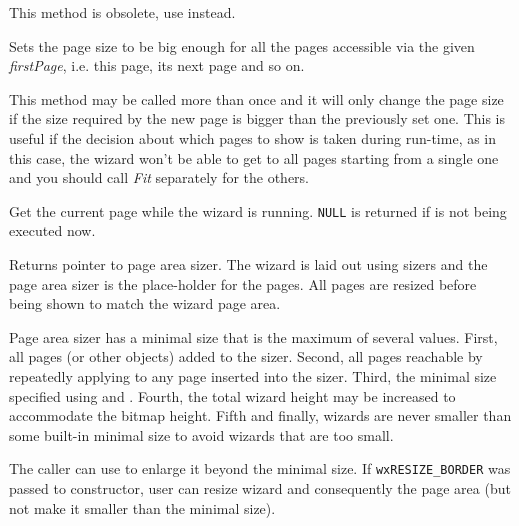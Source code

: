 

\label{wxwizardfittopage}


This method is obsolete, use
 instead.

Sets the page size to be big enough for all the pages accessible via the
given {\it firstPage}, i.e. this page, its next page and so on.

This method may be called more than once and it will only change the page size
if the size required by the new page is bigger than the previously set one.
This is useful if the decision about which pages to show is taken during
run-time, as in this case, the wizard won't be able to get to all pages starting
from a single one and you should call {\it Fit} separately for the others.


\label{wxwizardgetcurrentpage}


Get the current page while the wizard is running. {\tt NULL} is returned if 
 is not being executed now.


\label{wxwizardgetpageareasizer}


Returns pointer to page area sizer. The wizard is laid out using sizers and
the page area sizer is the place-holder for the pages. All pages are resized before
being shown to match the wizard page area.

Page area sizer has a minimal size that is the maximum of several values. First,
all pages (or other objects) added to the sizer. Second, all pages reachable
by repeatedly applying 
 to
any page inserted into the sizer. Third,
the minimal size specified using  and 
. Fourth, the total wizard height may
be increased to accommodate the bitmap height. Fifth and finally, wizards are
never smaller than some built-in minimal size to avoid wizards that are too small.

The caller can use  to enlarge it
beyond the minimal size. If {\tt wxRESIZE\_BORDER} was passed to constructor, user
can resize wizard and consequently the page area (but not make it smaller than the
minimal size).

